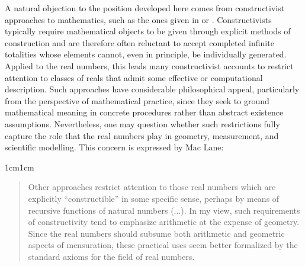 \documentclass[11pt,a4paper]{book}
\theoremstyle{plain}
\begin{document}
A natural objection to the position developed here comes from constructivist approaches to mathematics, such as the ones given in \textcite{Bishop1967} or \textcite{bridges1987varieties}. Constructivists typically require mathematical objects to be given through explicit methods of construction and are therefore often reluctant to accept completed infinite totalities whose elements cannot, even in principle, be individually generated. Applied to the real numbers, this leads many constructivist accounts to restrict attention to classes of reals that admit some effective or computational description. Such approaches have considerable philosophical appeal, particularly from the perspective of mathematical practice, since they seek to ground mathematical meaning in concrete procedures rather than abstract existence assumptions. Nevertheless, one may question whether such restrictions fully capture the role that the real numbers play in geometry, measurement, and scientific modelling. This concern is expressed by Mac Lane:

\begin{adjustwidth}{1cm}{1cm}
\small
\begin{quote}
Other approaches restrict attention to those real numbers which are explicitly “constructible” in some specific sense, perhaps by means of recursive functions of natural numbers (...). In my view, such requirements of constructivity tend to emphasize arithmetic at the expense of geometry. Since the real numbers should subsume both arithmetic and geometric aspects of mensuration, these practical uses seem better formalized by the standard axioms for the field of real numbers. \textcite[107]{maclane1986mathematics}
\end{quote}
\end{adjustwidth}
\end{document}
